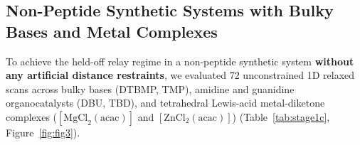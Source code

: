 \documentclass[11pt,a4paper]{article}
\begin{document}
\subsection{Non-Peptide Synthetic Systems with Bulky Bases and Metal Complexes}
To achieve the held-off relay regime in a non-peptide synthetic system \textbf{without any artificial distance restraints}, we evaluated 72 unconstrained 1D relaxed scans across bulky bases (DTBMP, TMP), amidine and guanidine organocatalysts (DBU, TBD), and tetrahedral Lewis-acid metal-diketone complexes ($[\text{MgCl}_2(\text{acac})]$ and $[\text{ZnCl}_2(\text{acac})]$) (Table~\ref{tab:stage1c}, Figure~\ref{fig:fig3}).

\begin{table}[htbp]
\centering
\caption{Pilot diagnostic unconstrained non-peptide proton-transfer barriers ($\Delta E_{\text{act}}$, kcal\,mol$^{-1}$, mean $\pm$ SD, median, and paired difference $\Delta\Delta E_{\text{act}}$ across $N_{\text{seed}} = 3$ seeds in GFN2-xTB/ALPB(water)), donor--acceptor distances $R_{\text{DA}}(\text{C3}\cdots\text{N})$ (\AA{}) in the relaxed reactant ($\text{R}$) and transition state ($\text{TS}$), and unconstrained product reaction energies ($\Delta E_{\text{rxn}}$, kcal\,mol$^{-1}$).}
\label{tab:stage1c}
\footnotesize
\setlength{\tabcolsep}{4pt}
\end{table}
\end{document}
